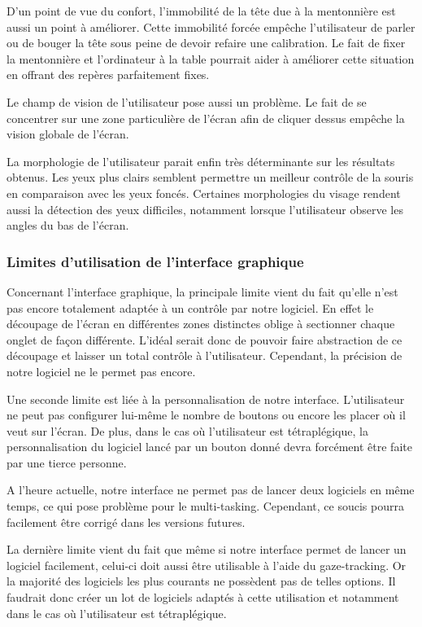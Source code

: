 D’un point de vue du confort, l’immobilité de la tête due à la mentonnière est aussi un point à améliorer. Cette immobilité forcée empêche l’utilisateur de parler ou de bouger la tête sous peine de devoir refaire une calibration. Le fait de fixer la mentonnière et l’ordinateur à la table pourrait aider à améliorer cette situation en offrant des repères parfaitement fixes.

Le champ de vision de l’utilisateur pose aussi un problème. Le fait de se concentrer sur une zone particulière de l’écran afin de cliquer dessus empêche la vision globale de l’écran.

La morphologie de l’utilisateur parait enfin très déterminante sur les résultats obtenus. Les yeux plus clairs semblent permettre un meilleur contrôle de la souris en comparaison avec les yeux foncés. Certaines morphologies du visage rendent aussi la détection des yeux difficiles, notamment lorsque l’utilisateur observe les angles du bas de l’écran.

\subsubsection{Limites d’utilisation de l’interface graphique}

Concernant l’interface graphique, la principale limite vient du fait qu’elle n’est pas encore totalement adaptée à un contrôle par notre logiciel. En effet le découpage de l’écran en différentes zones distinctes oblige à sectionner chaque onglet de façon différente. L’idéal serait donc de pouvoir faire abstraction de ce découpage et laisser un total contrôle à l’utilisateur. Cependant, la précision de notre logiciel ne le permet pas encore.

Une seconde limite est liée à la personnalisation de notre interface. L’utilisateur ne peut pas configurer lui-même le nombre de boutons ou encore les placer où il veut sur l’écran. De plus, dans le cas où l’utilisateur est tétraplégique, la personnalisation du logiciel lancé par un bouton donné devra forcément être faite par une tierce personne.

A l’heure actuelle, notre interface ne permet pas de lancer deux logiciels en même temps, ce qui pose problème pour le multi-tasking. Cependant, ce soucis pourra facilement être corrigé dans les versions futures.

La dernière limite vient du fait que même si notre interface permet de lancer un logiciel facilement, celui-ci doit aussi être utilisable à l’aide du gaze-tracking. Or la majorité des logiciels les plus courants ne possèdent pas de telles options. Il faudrait donc créer un lot de logiciels adaptés à cette utilisation et notamment dans le cas où l’utilisateur est tétraplégique.